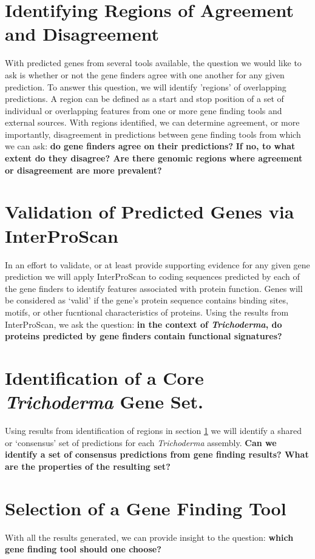 \section{Identifying Regions of Agreement and Disagreement} \label{identify-regions}

With predicted genes from several tools available, the question we
would like to ask is whether or not the gene finders agree with one
another for any given prediction. To answer this question, we will
identify 'regions' of overlapping predictions. A region can be defined
as a start and stop position of a set of individual or overlapping
features from one or more gene finding tools and external
sources. With regions identified, we can determine agreement, or more
importantly, disagreement in predictions between gene finding tools
from which we can ask: \textbf{do gene finders agree on their
  predictions?} \textbf{If no, to what extent do they disagree? Are
  there genomic regions where agreement or disagreement are more
  prevalent?}

\section{Validation of Predicted Genes via InterProScan}

In an effort to validate, or at least provide supporting evidence for
any given gene prediction we will apply InterProScan to coding
sequences predicted by each of the gene finders to identify features
associated with protein function. Genes will be considered as `valid'
if the gene's protein sequence contains binding sites, motifs, or
other fucntional characteristics of proteins. Using the results from
InterProScan, we ask the question: \textbf{in the context of
  \textit{Trichoderma}, do proteins predicted by gene finders contain
  functional signatures?}

\section{Identification of a Core \textit{Trichoderma} Gene Set.}

Using results from identification of regions in section
\ref{identify-regions} we will identify a shared or `consensus' set of
predictions for each \textit{Trichoderma} assembly. \textbf{Can we
  identify a set of consensus predictions from gene finding results?
  What are the properties of the resulting set?}

\section{Selection of a Gene Finding Tool}

With all the results generated, we can provide insight to the
question: \textbf{which gene finding tool should one choose?}
